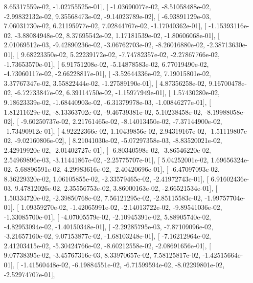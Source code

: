 \documentclass{article}
\begin{document}
          8.65317559e-02,  -1.02755525e-01],
       [ -1.03690077e-02,  -8.51058488e-02,  -2.99832132e-02,
          9.35568473e-02,  -9.14023789e-02],
       [ -6.93891129e-03,   7.06031730e-02,   6.21195977e-02,
          7.02844767e-02,  -1.17040362e-01],
       [ -1.15393116e-02,  -3.88084948e-02,   8.37695542e-02,
          1.17181539e-02,  -1.80606068e-01],
       [  2.01069512e-03,  -9.42890236e-02,  -3.06762703e-02,
         -8.26016880e-02,  -2.38713630e-01],
       [  9.68223350e-02,   5.22239172e-02,  -7.74782357e-02,
         -2.27867766e-02,  -1.73653570e-01],
       [  6.91751208e-02,  -5.14878583e-02,   6.77019490e-02,
         -4.73060117e-02,  -2.66228817e-01],
       [ -3.52644336e-02,   7.19015801e-02,   3.37767347e-02,
          3.55822444e-02,  -1.27589190e-01],
       [  4.87356258e-02,   9.16700478e-02,  -6.72733847e-02,
          6.39114750e-02,  -1.15977949e-01],
       [  1.57430280e-02,   9.18623339e-02,  -1.68440903e-02,
         -6.31379978e-03,  -1.00846277e-01],
       [  1.81211629e-02,  -8.13363702e-02,  -9.46739381e-02,
          5.10238458e-02,  -8.19988058e-02],
       [ -9.60250737e-02,   2.21761465e-02,  -8.14013450e-02,
         -7.37144900e-02,  -1.73490912e-01],
       [  4.92222366e-02,   1.10439856e-02,   2.94319167e-02,
         -1.51119807e-02,  -9.02160806e-02],
       [  8.21041030e-02,  -5.07297358e-03,  -8.83520021e-02,
          2.42919920e-02,  -2.01402727e-01],
       [ -6.80340598e-02,  -3.86546220e-02,   2.54969896e-03,
         -3.11441867e-02,  -2.25775707e-01],
       [  5.04252001e-02,   1.69656324e-02,   5.68896591e-02,
          4.29983616e-02,  -2.40420696e-01],
       [ -6.47097093e-02,   8.36229320e-02,   1.06105855e-02,
         -2.33579465e-02,  -2.41972743e-01],
       [  6.91602436e-03,   9.47812026e-02,   2.35556753e-02,
          3.86000163e-02,  -2.66521534e-01],
       [  1.50334720e-02,  -2.39850768e-02,   7.56121295e-02,
         -2.85115583e-02,  -1.99757704e-01],
       [  1.09359270e-02,  -1.42065991e-02,  -2.14013722e-02,
         -9.89541036e-02,  -1.33085700e-01],
       [ -4.07005579e-02,  -2.10945391e-02,   5.88905740e-02,
         -4.82953094e-02,  -1.40150348e-01],
       [ -2.29285795e-03,  -7.87109096e-02,  -3.21657160e-02,
          9.07153877e-02,  -1.68103248e-01],
       [ -7.16212964e-02,   2.41203415e-02,  -5.30424766e-02,
         -8.60212558e-02,  -2.08691656e-01],
       [  9.07738395e-02,  -3.45767316e-03,   8.33970657e-02,
          7.58125817e-02,  -1.42515664e-01],
       [ -1.41560448e-02,  -6.19884551e-02,  -6.71599594e-02,
         -8.02299801e-02,  -2.52974707e-01],
\end{document}
